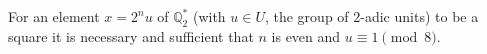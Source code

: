 For an element $x = 2^n u$ of $\mathbb{Q}_2^*$ (with $u \in U$, the group of 2-adic units) to be a square it is necessary and sufficient that $n$ is even and $u \equiv 1 \pmod{8}$.
